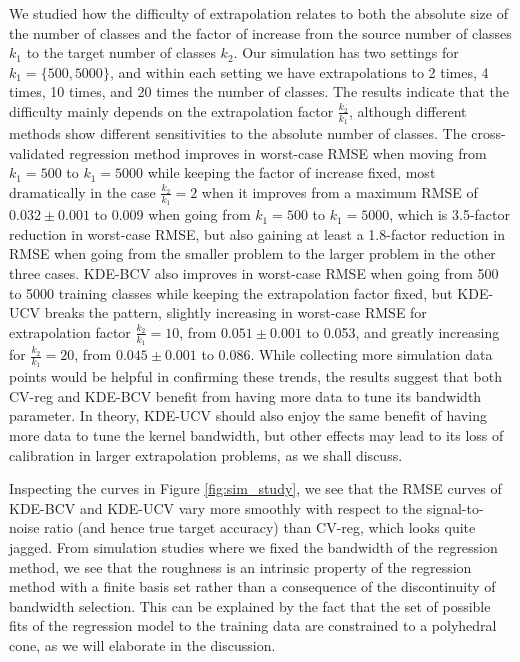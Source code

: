 \documentclass[twoside,11pt]{article}
\begin{document}
We studied how the difficulty of extrapolation relates to both the
absolute size of the number of classes and the factor of increase from
the source number of classes $k_1$ to the target number of classes
$k_2$.  Our simulation has two settings for $k_1 = \{500,5000\}$, and
within each setting we have extrapolations to 2 times, 4 times, 10
times, and 20 times the number of classes.  The results indicate that
the difficulty mainly depends on the extrapolation factor
$\frac{k_2}{k_1}$, although different methods show different
sensitivities to the absolute number of classes.  The cross-validated
regression method improves in worst-case RMSE when moving from $k_1 =
500$ to $k_1 = 5000$ while keeping the factor of increase fixed, most
dramatically in the case $\frac{k_2}{k_1} = 2$ when it improves from a
maximum RMSE of $0.032\pm0.001$ to 0.009 when going from $k_1 = 500$
to $k_1 = 5000$, which is 3.5-factor reduction in worst-case RMSE, but
also gaining at least a 1.8-factor reduction in RMSE when going from
the smaller problem to the larger problem in the other three cases.
KDE-BCV also improves in worst-case RMSE when going from 500 to 5000
training classes while keeping the extrapolation factor fixed, but
KDE-UCV breaks the pattern, slightly increasing in worst-case RMSE for
extrapolation factor $\frac{k_2}{k_1} = 10$, from $0.051\pm0.001$ to
0.053, and greatly increasing for $\frac{k_2}{k_1} = 20$, from
$0.045\pm0.001$ to 0.086.  While collecting more simulation data
points would be helpful in confirming these trends, the results
suggest that both CV-reg and KDE-BCV benefit from having more data to
tune its bandwidth parameter.  In theory, KDE-UCV should also enjoy
the same benefit of having more data to tune the kernel bandwidth, but
other effects may lead to its loss of calibration in larger
extrapolation problems, as we shall discuss.

Inspecting the curves in Figure \ref{fig:sim_study}, we see that the
RMSE curves of KDE-BCV and KDE-UCV vary more smoothly with respect to
the signal-to-noise ratio (and hence true target accuracy) than
CV-reg, which looks quite jagged.  From simulation studies where we
fixed the bandwidth of the regression method, we see that the
roughness is an intrinsic property of the regression method with a
finite basis set rather than a consequence of the discontinuity of
bandwidth selection.  This can be explained by the fact that the set
of possible fits of the regression model to the training data are
constrained to a polyhedral cone, as we will elaborate in the discussion.
\end{document}
